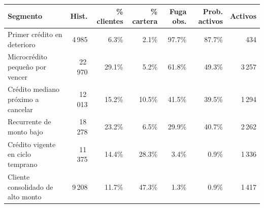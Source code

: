 \begin{tabular}{@{}p{4.6cm}rrrrrr@{}}
\toprule
\textbf{Segmento} & \textbf{Hist.} & \textbf{\% clientes} & \textbf{\% cartera} & \textbf{Fuga obs.} & \textbf{Prob. activos} & \textbf{Activos} \\
\midrule
Primer crédito en deterioro & 4\,985 & 6.3\% & 2.1\% & 97.7\% & 87.7\% & 434 \\
Microcrédito pequeño por vencer & 22\,970 & 29.1\% & 5.2\% & 61.8\% & 49.3\% & 3\,257 \\
Crédito mediano próximo a cancelar & 12\,013 & 15.2\% & 10.5\% & 41.5\% & 39.5\% & 1\,294 \\
Recurrente de monto bajo & 18\,278 & 23.2\% & 6.5\% & 29.9\% & 40.7\% & 2\,262 \\
Crédito vigente en ciclo temprano & 11\,375 & 14.4\% & 28.3\% & 3.4\% & 0.9\% & 1\,336 \\
Cliente consolidado de alto monto & 9\,208 & 11.7\% & 47.3\% & 1.3\% & 0.9\% & 1\,417 \\
\bottomrule
\end{tabular}